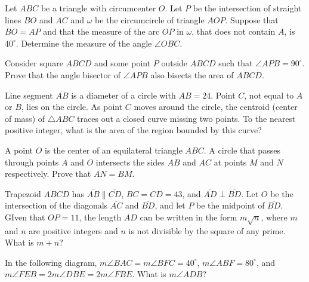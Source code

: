 \documentclass{article}
\begin{document}
\begin{prob}[Brazil 2004]{2}
\begin{enumerate}
\begin{req}[Brazil 2007]{4}
Let $ABC$ be a triangle with circumcenter $O$. Let $P$ be the intersection of straight lines $BO$ and $AC$ and $\omega$ be the circumcircle of triangle $AOP$. Suppose that $BO = AP$ and that the measure of the arc $OP$ in $\omega$, that does not contain $A$, is $40^{\circ}$. Determine the measure of the angle $\angle OBC$.
\end{req}

\begin{prob}[]{4}
Consider square $ABCD$ and some point $P$ outside $ABCD$ such that $\angle APB=90^{\circ}.$ Prove that the angle bisector of $\angle APB$ also bisects the area of $ABCD.$
\end{prob}
 
\begin{req}[AMC 10B 2018/12]{4}
Line segment $\overline{AB}$ is a diameter of a circle with $AB=24$. Point $C$, not equal to $A$ or $B$, lies on the circle. As point $C$ moves around the circle, the centroid (center of mass) of $\triangle{ABC}$ traces out a closed curve missing two points. To the nearest positive integer, what is the area of the region bounded by this curve?
\end{req}

\begin{prob}{6}
A point $O$ is the center of an equilateral triangle $ABC.$ A circle that passes through points $A$ and $O$ intersects the sides $AB$ and $AC$ at points $M$ and $N$ respectively. Prove that $AN = BM.$
\end{prob}

\begin{req}[AMC 10A 2021/17]{6}
Trapezoid $ABCD$ has $\overline{AB} \parallel \overline{CD}$, $BC = CD = 43$, and $\overline{AD} \perp \overline{BD}$. Let $O$ be the intersection of the diagonals $\overline{AC}$ and $\overline{BD}$, and let $P$ be the midpoint of $\overline{BD}$. GIven that $OP = 11$, the length $AD$ can be written in the form $m\sqrt{n}$, where $m$ and $n$ are positive integers and $n$ is not divisible by the square of any prime. What is $m + n$?
\end{req}
    
\begin{prob}{6}
In the following diagram, $m\angle BAC=m\angle BFC=40^{\circ}$, $m\angle ABF=80^{\circ}$, and $m\angle FEB=2m\angle DBE=2m\angle FBE$. What is $m\angle ADB$?
\end{prob}
    

\end{enumerate}
\end{prob}
\end{document}
